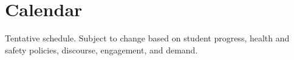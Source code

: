 \section{Calendar}

Tentative schedule. Subject to change based on student progress, health and safety policies, discourse, engagement, and demand.

\def\weekA{\vspace*{-1em}
    
}
\def\weekB{\vspace*{-1em}
    
}
\def\weekC{\vspace*{-1em}
    
}
\def\weekD{\vspace*{-1em}
    
}
\def\weekE{\vspace*{-1em}
    
}
\def\weekF{\vspace*{-1em}
    
}
\def\weekG{\vspace*{-1em}
    
}
\def\weekH{\vspace*{-1em}
    
}
\def\weekI{\vspace*{-1em}
    
}
\def\weekJ{\vspace*{-1em}
    
}
\def\weekK{\vspace*{-1em}
    
}
\def\weekL{\vspace*{-1em}
    
}
\def\weekM{\vspace*{-1em}
    
}
\def\weekN{\vspace*{-1em}
    
}
\def\weekO{\vspace*{-1em}
    
}
\def\weekP{\vspace*{-1em}
    
}


\def\tend{\\\hline}

